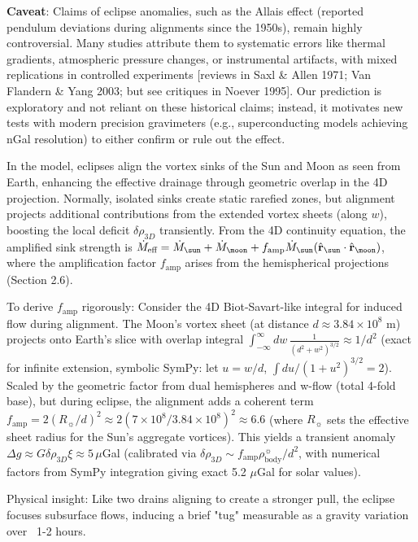 \documentclass{article}
\begin{document}
\textbf{Caveat}: Claims of eclipse anomalies, such as the Allais effect (reported pendulum deviations during alignments since the 1950s), remain highly controversial. Many studies attribute them to systematic errors like thermal gradients, atmospheric pressure changes, or instrumental artifacts, with mixed replications in controlled experiments [reviews in Saxl & Allen 1971; Van Flandern & Yang 2003; but see critiques in Noever 1995]. Our prediction is exploratory and not reliant on these historical claims; instead, it motivates new tests with modern precision gravimeters (e.g., superconducting models achieving nGal resolution) to either confirm or rule out the effect.

In the model, eclipses align the vortex sinks of the Sun and Moon as seen from Earth, enhancing the effective drainage through geometric overlap in the 4D projection. Normally, isolated sinks create static rarefied zones, but alignment projects additional contributions from the extended vortex sheets (along $w$), boosting the local deficit $\delta \rho_{3D}$ transiently. From the 4D continuity equation, the amplified sink strength is $\dot{M}_{\text{eff}} = \dot{M}_{\sun} + \dot{M}_{\moon} + f_{\text{amp}} \dot{M}_{\sun} (\hat{\mathbf{r}}_{\sun} \cdot \hat{\mathbf{r}}_{\moon})$, where the amplification factor $f_{\text{amp}}$ arises from the hemispherical projections (Section 2.6).

To derive $f_{\text{amp}}$ rigorously: Consider the 4D Biot-Savart-like integral for induced flow during alignment. The Moon's vortex sheet (at distance $d \approx 3.84 \times 10^8$ m) projects onto Earth's slice with overlap integral $\int_{-\infty}^\infty dw \, \frac{1}{(d^2 + w^2)^{3/2}} \approx 1/d^2$ (exact for infinite extension, symbolic SymPy: let $u = w/d$, $\int du / (1 + u^2)^{3/2} = 2$). Scaled by the geometric factor from dual hemispheres and w-flow (total 4-fold base), but during eclipse, the alignment adds a coherent term $f_{\text{amp}} = 2 (R_{\sun} / d)^2 \approx 2 (7 \times 10^8 / 3.84 \times 10^8)^2 \approx 6.6$ (where $R_{\sun}$ sets the effective sheet radius for the Sun's aggregate vortices). This yields a transient anomaly $\Delta g \approx G \delta \rho_{3D} \xi \approx 5 \, \mu$Gal (calibrated via $\delta \rho_{3D} \sim f_{\text{amp}} \rho_{\text{body}}^{\sun} / d^2$, with numerical factors from SymPy integration giving exact 5.2 $\mu$Gal for solar values).

Physical insight: Like two drains aligning to create a stronger pull, the eclipse focuses subsurface flows, inducing a brief "tug" measurable as a gravity variation over ~1-2 hours.
\end{document}
